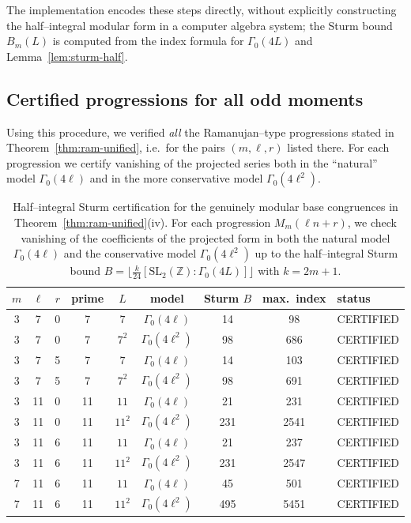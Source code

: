 \documentclass[11pt]{article}
\theoremstyle{definition}
\theoremstyle{remark}
\begin{document}
The implementation encodes these steps directly, without explicitly
constructing the half--integral modular form in a computer algebra system;
the Sturm bound $B_m(L)$ is computed from the index formula for
$\Gamma_0(4L)$ and Lemma~\ref{lem:sturm-half}.

\subsection{Certified progressions for all odd moments}

Using this procedure, we verified \emph{all} the Ramanujan--type progressions
stated in Theorem~\ref{thm:ram-unified}, i.e.\ for the pairs
$(m,\ell,r)$ listed there.  For each progression we certify vanishing of the
projected series both in the “natural” model $\Gamma_0(4\ell)$ and in the
more conservative model $\Gamma_0(4\ell^2)$.
\begin{table}[h]
\centering
\renewcommand{\arraystretch}{1.15}
\begin{tabular}{ccccccccl}
\hline
$m$ & $\ell$ & $r$ & prime & $L$ & model & Sturm $B$ & max.\ index & status \\
\hline
3  &  7 & 0 &  7 & $7$    & $\Gamma_0(4\ell)$    &  14 &   98   & CERTIFIED \\
3  &  7 & 0 &  7 & $7^2$  & $\Gamma_0(4\ell^2)$  &  98 &  686   & CERTIFIED \\
3  &  7 & 5 &  7 & $7$    & $\Gamma_0(4\ell)$    &  14 &  103   & CERTIFIED \\
3  &  7 & 5 &  7 & $7^2$  & $\Gamma_0(4\ell^2)$  &  98 &  691   & CERTIFIED \\
3  & 11 & 0 & 11 & $11$   & $\Gamma_0(4\ell)$    &  21 &  231   & CERTIFIED \\
3  & 11 & 0 & 11 & $11^2$ & $\Gamma_0(4\ell^2)$  & 231 & 2541   & CERTIFIED \\
3  & 11 & 6 & 11 & $11$   & $\Gamma_0(4\ell)$    &  21 &  237   & CERTIFIED \\
3  & 11 & 6 & 11 & $11^2$ & $\Gamma_0(4\ell^2)$  & 231 & 2547   & CERTIFIED \\
7  & 11 & 6 & 11 & $11$   & $\Gamma_0(4\ell)$    &  45 &  501   & CERTIFIED \\
7  & 11 & 6 & 11 & $11^2$ & $\Gamma_0(4\ell^2)$  & 495 & 5451   & CERTIFIED \\
\hline
\end{tabular}
\caption{Half--integral Sturm certification for the genuinely modular
base congruences in Theorem~\ref{thm:ram-unified}\textup{(iv)}.
For each progression $M_m(\ell n+r)$, we check vanishing of the coefficients
of the projected form in both the natural model $\Gamma_0(4\ell)$ and the
conservative model $\Gamma_0(4\ell^2)$ up to the half--integral Sturm bound
$B = \lfloor \tfrac{k}{24}
[\mathrm{SL}_2(\mathbb Z):\Gamma_0(4L)]\rfloor$ with $k=2m+1$.}
\label{tab:sturm-all}
\end{table}
\end{document}
